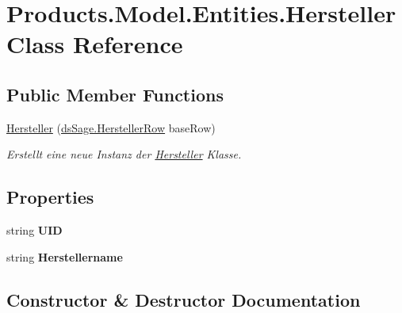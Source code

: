 \hypertarget{class_products_1_1_model_1_1_entities_1_1_hersteller}{}\section{Products.\+Model.\+Entities.\+Hersteller Class Reference}
\label{class_products_1_1_model_1_1_entities_1_1_hersteller}
\subsection*{Public Member Functions}
\begin{DoxyCompactItemize}
\item 
\hyperlink{class_products_1_1_model_1_1_entities_1_1_hersteller_a6127597927c0d83877f99a0b57bea0e6}{Hersteller} (\hyperlink{class_products_1_1_data_1_1ds_sage_1_1_hersteller_row}{ds\+Sage.\+Hersteller\+Row} base\+Row)
\begin{DoxyCompactList}\small\item\em Erstellt eine neue Instanz der \hyperlink{class_products_1_1_model_1_1_entities_1_1_hersteller}{Hersteller} Klasse. \end{DoxyCompactList}\end{DoxyCompactItemize}
\subsection*{Properties}
\begin{DoxyCompactItemize}
\item 
string {\bfseries U\+ID}\hypertarget{class_products_1_1_model_1_1_entities_1_1_hersteller_ad75cc2eee6dbd4c6daec8c63bf4c90e3}{}\label{class_products_1_1_model_1_1_entities_1_1_hersteller_ad75cc2eee6dbd4c6daec8c63bf4c90e3}

\item 
string {\bfseries Herstellername}\hypertarget{class_products_1_1_model_1_1_entities_1_1_hersteller_a2c87b638bd6945cf1a5368d4eeb47a15}{}\label{class_products_1_1_model_1_1_entities_1_1_hersteller_a2c87b638bd6945cf1a5368d4eeb47a15}

\end{DoxyCompactItemize}


\subsection{Constructor \& Destructor Documentation}
